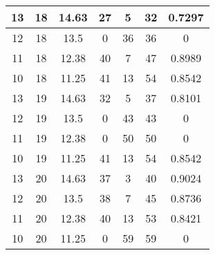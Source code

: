 \documentclass[letterpaper, 12pt]{article}
\begin{document}
\begin{longtable}{|c|c|c|c|c|c|c|}
\hline
13 & 18 & 14.63 & 27 & 5 & 32 & 0.7297 \\
\hline
12 & 18 & 13.5 & 0 & 36 & 36 & 0 \\
\hline
11 & 18 & 12.38 & 40 & 7 & 47 & 0.8989 \\
\hline
10 & 18 & 11.25 & 41 & 13 & 54 & 0.8542 \\
\hline
13 & 19 & 14.63 & 32 & 5 & 37 & 0.8101 \\
\hline
12 & 19 & 13.5 & 0 & 43 & 43 & 0 \\
\hline
11 & 19 & 12.38 & 0 & 50 & 50 & 0 \\
\hline
10 & 19 & 11.25 & 41 & 13 & 54 & 0.8542 \\
\hline
13 & 20 & 14.63 & 37 & 3 & 40 & 0.9024 \\
\hline
12 & 20 & 13.5 & 38 & 7 & 45 & 0.8736 \\
\hline
11 & 20 & 12.38 & 40 & 13 & 53 & 0.8421 \\
\hline
10 & 20 & 11.25 & 0 & 59 & 59 & 0 \\
\hline
\end{longtable}
\end{document}

